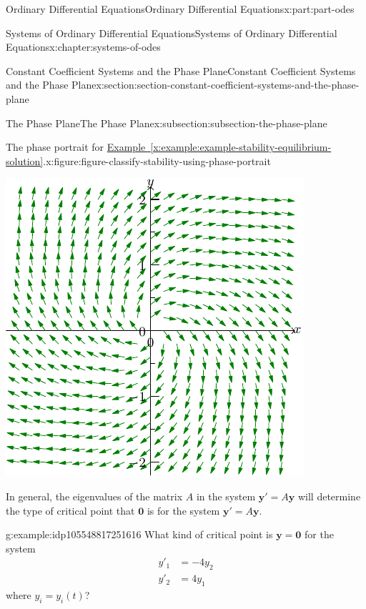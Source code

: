 \documentclass[twoside,10pt,]{book}
\newcommand{\xreffont}{\relax}
\numberwithin{equation}{part}
\renewcommand{\vec}[1]{\mathbf{#1}}
\newcommand{\amp}{&}
\begin{document}
\begin{partptx}{Ordinary Differential Equations}{}{Ordinary Differential Equations}{}{}{x:part:part-odes}
\begin{chapterptx}{Systems of Ordinary Differential Equations}{}{Systems of Ordinary Differential Equations}{}{}{x:chapter:systems-of-odes}
\begin{sectionptx}{Constant Coefficient Systems and the Phase Plane}{}{Constant Coefficient Systems and the Phase Plane}{}{}{x:section:section-constant-coefficient-systems-and-the-phase-plane}
\begin{subsectionptx}{The Phase Plane}{}{The Phase Plane}{}{}{x:subsection:subsection-the-phase-plane}
\begin{figureptx}{The phase portrait for \hyperref[x:example:example-stability-equilibrium-solution]{Example~{\xreffont\ref{x:example:example-stability-equilibrium-solution}}}.}{x:figure:figure-classify-stability-using-phase-portrait}{}
\begin{image}{0.25}{0.5}{0.25}
\includegraphics[width=\linewidth]{generated/asymptote/image-16.pdf}
\end{image}%
\tcblower
\end{figureptx}%
In general, the eigenvalues of the matrix \(A\) in the system \(\vec{y}' = A\vec{y}\) will determine the type of critical point that \(\vec{0}\) is for the system \(\vec{y}'=A\vec{y}\).%
\begin{example}{}{g:example:idp105548817251616}%
What kind of critical point is \(\vec{y} = \vec{0}\) for the system%
\begin{align*}
y'_{1} \amp = -4y_{2}\\
y'_{2}  \amp =  4y_{1}
\end{align*}
where \(y_{i} = y_{i}(t)\)?%
\par\smallskip%

\end{example}
\end{subsectionptx}
\end{sectionptx}
\end{chapterptx}
\end{partptx}
\end{document}
